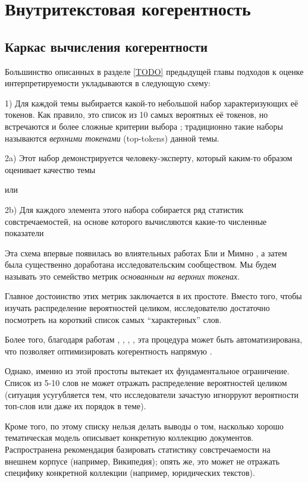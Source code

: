 \chapter{Внутритекстовая когерентность}


\section{Каркас вычисления когерентности}

Большинство описанных в разделе \ref{TODO} предыдущей главы подходов к оценке интерпретируемости укладываются в следующую схему:

1) Для каждой темы выбирается какой-то небольшой набор характеризующих её токенов. Как правило, это список из 10 самых вероятных её токенов, но встречаются и более сложные критерии выбора \cite{blei2009topic}\cite{ldavis2014}\cite{boydcare}; традиционно такие наборы называются \textit{верхними токенами} (top-tokens) данной темы.

2a) Этот набор демонстрируется человеку-эксперту, который каким-то образом оценивает качество темы

или

2b) Для каждого элемента этого набора собирается ряд статистик совстречаемостей, на основе которого вычисляются какие-то численные показатели

Эта схема впервые появилась во влиятельных работах Бли \cite{rtl} \cite{mrtl} и Мимно \cite{mimno2011}, а затем была существенно доработана исследовательским сообществом. Мы будем называть это семейство метрик \textit{основанным на верхних токенах}. 

Главное достоинство этих метрик заключается в их простоте. Вместо того, чтобы изучать распределение вероятностей целиком, исследователю достаточно посмотреть на короткий список самых ``характерных'' слов.

Более того, благодаря работам \cite{mrtl}, \cite{mimno2011}, \cite{aletras2013evaluating}, \cite{roder2015exploring}, эта процедура может быть автоматизирована, что позволяет оптимизировать когерентность напрямую \cite{4keys}.

Однако, именно из этой простоты вытекает их фундаментальное ограничение. Список из 5-10 слов не может отражать распределение вероятностей целиком (ситуация усугубляется тем, что исследователи зачастую игнорруют вероятности топ-слов или даже их порядок в теме). 

Кроме того, по этому списку нельзя делать выводы о том, насколько хорошо тематическая модель описывает конкретную коллекцию документов. Распространена рекомендация базировать статистику совстречаемости на внешнем корпусе (например, Википедия); опять же, это может не отражать специфику конкретной коллекции (например, юридических текстов).

